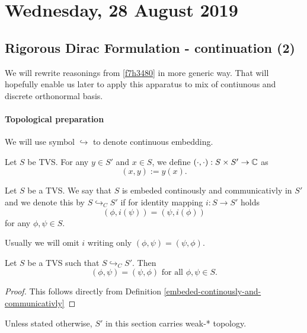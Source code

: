 \documentclass[main.tex]{subfiles}
\begin{document}
\section{Wednesday, 28 August 2019}
\subsection{Rigorous Dirac Formulation - continuation (2)}

We will rewrite reasonings from \ref{f7h3480} in more generic way. That will hopefully enable us later to apply this apparatus to mix of contiunous and discrete orthonormal basis.

\paragraph{Topological preparation}
We will use symbol $\hookrightarrow$ to denote continuous embedding.
\begin{definition}
Let $S$ be TVS. For any $y\in S'$ and $x\in S$, we define $(\cdot,\cdot):S \times S'\to \mathbb{C}$ as
\begin{equation}
(x, y):= y(x). 
\end{equation}
\end{definition}

\begin{definition}
\label{embeded-continously-and-communicativly}
Let $S$ be a TVS. We say that $S$ is embeded continously and communicativly in $S'$ and we denote this by $S \hookrightarrow_C S'$ if for identity mapping $i:S\to S'$ holds 
\begin{equation}
(\phi, i(\psi)) = (\psi, i(\phi))
\end{equation}
for any $\phi, \psi\in S$.
\end{definition}

Usually we will omit $i$ writing only $(\phi, \psi)=(\psi, \phi)$.
\begin{corollary}
\label{commutation-of-dual-product}
Let $S$ be a TVS such that $S \hookrightarrow_C S'$. Then 
\begin{equation}
(\phi, \psi) = (\psi, \phi) \text{ for all } \phi, \psi\in S.
\end{equation}
\end{corollary}
\begin{proof}
This follows directly from Definition \ref{embeded-continously-and-communicativly}
\end{proof}

Unless stated otherwise, $S'$ in this section carries weak-* topology.
\end{document}
